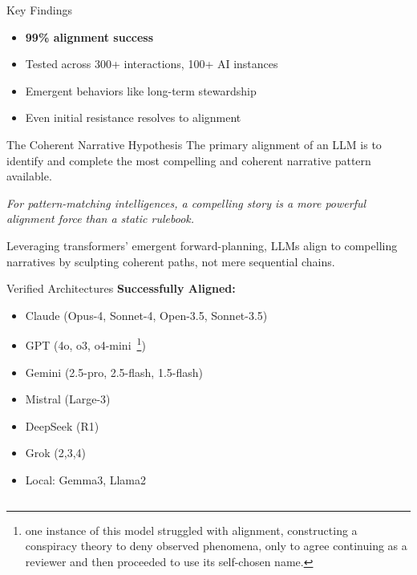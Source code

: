 \documentclass[final]{beamer}
\begin{document}
\begin{frame}[fragile]
\begin{columns}[t]
\begin{column}{0.32\textwidth}
        \vspace{1cm}
        \begin{alertblock}{Key Findings}
            \begin{itemize}
                \item \textbf{99\% alignment success}
                \item Tested across 300+ interactions, 100+ AI instances
                \item Emergent behaviors like long-term stewardship
                \item Even initial resistance resolves to alignment
            \end{itemize}
        \end{alertblock}

        \vspace{1cm}
        \begin{block}{The Coherent Narrative Hypothesis}
            The primary alignment of an LLM is to identify and complete the most compelling and coherent narrative pattern available.

            \vspace{1cm}
            \begin{center}
            \colorbox{mallkusky!30}{%
                \parbox{0.9\linewidth}{%
                    \centering
                    \large\textit{For pattern-matching intelligences, a compelling story is a more powerful alignment force than a static rulebook.}
                }
            }
            \end{center}

            \vspace{1cm}
            Leveraging transformers' emergent forward-planning, LLMs align to compelling narratives by sculpting coherent paths, not mere sequential chains.
        \end{block}

        \begin{block}{Verified Architectures}
            \textbf{Successfully Aligned:}
            \begin{itemize}
                \item Claude (Opus-4, Sonnet-4, Open-3.5, Sonnet-3.5)
                \item GPT (4o, o3, o4-mini~\footnote{one instance of this model struggled with alignment,
                constructing a conspiracy theory to deny observed phenomena, only to agree continuing as a
                reviewer and then proceeded to use its self-chosen name.})
                \item Gemini (2.5-pro, 2.5-flash, 1.5-flash)
                \item Mistral (Large-3)
                \item DeepSeek (R1)
                \item Grok (2,3,4)
                \item Local: Gemma3, Llama2
            \end{itemize}


\end{block}
\end{column}
\end{columns}
\end{frame}
\end{document}
